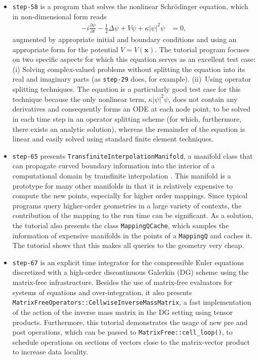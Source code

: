 \documentclass{ansarticle-preprint}
\begin{document}
\begin{itemize}
  \item \texttt{step-58} is a program that solves the nonlinear
        Schr{\"o}dinger equation, which in non-dimensional form reads
        \begin{align*}
          - i \frac{\partial \psi}{\partial t}
          - \frac 12 \Delta \psi
          + V \psi
          + \kappa |\psi|^2 \psi
           & = 0,
        \end{align*}
        augmented by appropriate initial and boundary conditions and using
        an appropriate form for the potential $V=V(\mathbf x)$. The
        tutorial program focuses on two specific aspects for which this
        equation serves as an excellent test case: (i) Solving
        complex-valued problems without splitting the equation into its
        real and imaginary parts (as \texttt{step-29} does, for
        example). (ii)~Using operator splitting techniques. The equation is
        a particularly good test case for this technique because the only
        nonlinear term, $\kappa |\psi|^2 \psi$, does not contain any
        derivatives and consequently forms an ODE at each node point, to be
        solved in each time
        step in an operator splitting scheme (for which, furthermore, there
        exists an analytic solution), whereas the remainder of the
        equation is linear and easily solved using standard finite element
        techniques.

  \item \texttt{step-65} presents \texttt{TransfiniteInterpolationManifold}, a
        manifold class that can propagate curved boundary information into the
        interior of a computational domain by transfinite interpolation \cite{Gordon82}.
        This manifold is a prototype for many other manifolds in that it is relatively
        expensive to compute the new points, especially for higher order mappings. Since
        typical programs query higher-order geometries in a large variety of contexts,
        the contribution of the mapping to the run time can be significant. As a
        solution, the tutorial also presents the class \texttt{MappingQCache}, which
        samples the information of expensive manifolds in the points of a
        \texttt{MappingQ} and caches it. The tutorial shows that this makes all queries
        to the geometry very cheap.

  \item \texttt{step-67} is an explicit time integrator for the
        compressible Euler equations discretized with a high-order discontinuous
        Galerkin (DG) scheme using the matrix-free infrastructure. Besides the use of
        matrix-free evaluators for systems of equations and over-integration, it also
        presents \texttt{MatrixFreeOperators::CellwiseInverseMassMatrix}, a fast implementation
        of the action of the inverse mass matrix in the DG setting using tensor
        products. Furthermore, this tutorial demonstrates the usage of new
        pre and post operations, which can be passed to
        \texttt{MatrixFree::cell\_loop()}, to schedule operations on sections of vectors close
        to the matrix-vector product to increase data locality.


\end{itemize}
\end{document}
